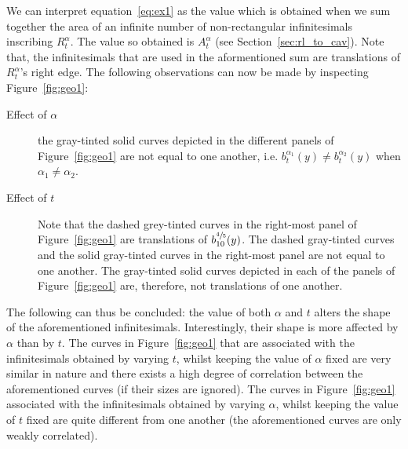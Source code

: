 \documentclass[twoside,reqno,11pt]{fcaa-var} %
\begin{document}
\noindent
We can interpret equation~\eqref{eq:ex1} as the value which is obtained when we sum together the area of an infinite number of non-rectangular infinitesimals inscribing $R_{t}^{\alpha}$. The value so obtained is $A_{t}^{\alpha}$ (see Section~\ref{sec:rl_to_cav}). Note that, the infinitesimals that are used in the aformentioned sum are translations of $R_{t}^{\alpha}$'s right edge. The following observations can now be made by inspecting Figure~\ref{fig:geo1}: 
\begin{description}
 \item[Effect of $\alpha$] the gray-tinted solid curves depicted in the different panels of Figure~\ref{fig:geo1} are not equal to one another, i.e. $b_{t}^{\alpha_1}(y)\neq b_{t}^{\alpha_2}(y)$ when $\alpha_1\neq\alpha_2$. 
 \item[Effect of $t$] Note that the dashed grey-tinted curves in the right-most panel of Figure~\ref{fig:geo1} are translations of $b_{10}^{\sfrac{4}{5}}(y)$. The dashed gray-tinted curves and the solid gray-tinted curves in the right-most panel are not equal to one another. The gray-tinted solid curves depicted in each of the panels of Figure~\ref{fig:geo1} are, therefore, not translations of one another. 
\end{description}
The following can thus be concluded: the value of both $\alpha$ and $t$ alters the shape of the aforementioned infinitesimals. Interestingly, their shape is more affected by $\alpha$ than by $t$. The curves in Figure~\ref{fig:geo1} that are associated with the infinitesimals obtained by varying $t$, whilst keeping the value of $\alpha$ fixed are very similar in nature and there exists a high degree of correlation between the aforementioned curves (if their 
sizes are ignored). The curves in Figure~\ref{fig:geo1} associated with the infinitesimals obtained by varying $\alpha$, whilst keeping the value of $t$ fixed are quite different from one another (the aforementioned curves are only weakly correlated).\\  

\end{document}
